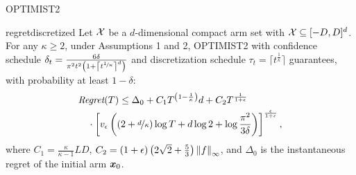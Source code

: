 \begin{frame}{OPTIMIST2}
\begin{theorem}{regretdiscretized}\label{th:regretdiscretized}
	Let $\Xspace$ be a $d$-dimensional compact arm set with $\Xspace \subseteq [-D,D]^d$. For any $\kappa\geq2$, under Assumptions 1 and 2, OPTIMIST2 with confidence schedule ${\delta_t = \frac{6\delta}{\pi^2t^2\left(1+\left\lceil t^{\nicefrac{1}{\kappa}}\right\rceil^d\right)}}$ and discretization schedule $\tau_t=\lceil t^{\frac{1}{\kappa}} \rceil$ guarantees, with probability at least $1-\delta$:
	\begin{align*}
	&\Reg(T) \leq \Delta_0  + C_1T^{\left(1-\frac{1}{\kappa}\right)}d
	+ C_2
	T^{\frac{1}{1+\epsilon}} %
	\\&\quad\cdot\left[v_{\epsilon}
	\left(\left(2+ \nicefrac{d}{\kappa}\right)\log T + d\log 2 + \log\frac{\pi^2}{3\delta}\right)\right]^{\frac{\epsilon}{1+\epsilon}},
	\end{align*}
	where $C_1=\frac{\kappa}{\kappa-1}LD$, $C_2=(1+\epsilon)\left(2\sqrt{2}+\frac{5}{3}\right)\norm[\infty]{f}$, and $\Delta_0$ is the instantaneous regret of the initial arm $\vx_0$.
\end{theorem}
\end{frame}